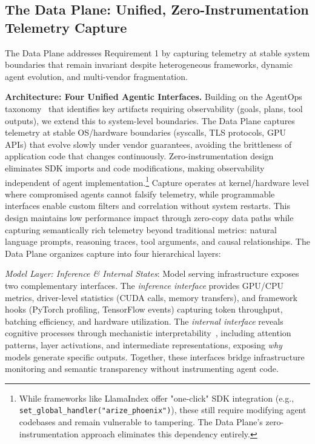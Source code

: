 \documentclass[sigplan,screen,9pt]{acmart}
\begin{document}
\subsection{The Data Plane: Unified, Zero-Instrumentation Telemetry Capture}

The Data Plane addresses Requirement 1 by capturing telemetry at stable system boundaries that remain invariant despite heterogeneous frameworks, dynamic agent evolution, and multi-vendor fragmentation.

\textbf{Architecture: Four Unified Agentic Interfaces.} Building on the AgentOps taxonomy~\cite{Dong2024AgentOps} that identifies key artifacts requiring observability (goals, plans, tool outputs), we extend this to system-level boundaries. The Data Plane captures telemetry at stable OS/hardware boundaries (syscalls, TLS protocols, GPU APIs) that evolve slowly under vendor guarantees, avoiding the brittleness of application code that changes continuously. Zero-instrumentation design eliminates SDK imports and code modifications, making observability independent of agent implementation.\footnote{While frameworks like LlamaIndex offer "one-click" SDK integration (e.g., \texttt{set\_global\_handler("arize\_phoenix")}), these still require modifying agent codebases and remain vulnerable to tampering. The Data Plane's zero-instrumentation approach eliminates this dependency entirely.} Capture operates at kernel/hardware level where compromised agents cannot falsify telemetry, while programmable interfaces enable custom filters and correlation without system restarts. This design maintains low performance impact through zero-copy data paths while capturing semantically rich telemetry beyond traditional metrics: natural language prompts, reasoning traces, tool arguments, and causal relationships. The Data Plane organizes capture into four hierarchical layers:

\emph{Model Layer: Inference \& Internal States}: Model serving infrastructure exposes two complementary interfaces. The \emph{inference interface} provides GPU/CPU metrics, driver-level statistics (CUDA calls, memory transfers), and framework hooks (PyTorch profiling, TensorFlow events) capturing token throughput, batching efficiency, and hardware utilization. The \emph{internal interface} reveals cognitive processes through mechanistic interpretability~\cite{Kim2025AgenticInterp}, including attention patterns, layer activations, and intermediate representations, exposing \emph{why} models generate specific outputs. Together, these interfaces bridge infrastructure monitoring and semantic transparency without instrumenting agent code.
\end{document}
